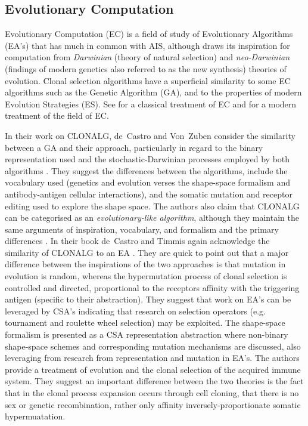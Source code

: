 %
%
\subsection{Evolutionary Computation}
\label{subsec:cs:related:ec}
Evolutionary Computation (EC) is a field of study of Evolutionary Algorithms (EA's) that has much in common with AIS, although draws its inspiration for computation from \emph{Darwinian} (theory of natural selection) and \emph{neo-Darwinian} (findings of modern genetics also referred to as the new synthesis) theories of evolution. Clonal selection algorithms have a superficial similarity to some EC algorithms such as the Genetic Algorithm (GA), and to the properties of modern Evolution Strategies (ES). See \cite{Fogel1995, Goldberg1989a} for a classical treatment of EC and \cite{Back2000, Back2000a} for a modern treatment of the field of EC. 

In their work on CLONALG, de~Castro and Von~Zuben consider the similarity between a GA and their approach, particularly in regard to the binary representation used and the stochastic-Darwinian processes employed by both algorithms \cite{Castro1999}. They suggest the differences between the algorithms, include the vocabulary used (genetics and evolution verses the shape-space formalism and antibody-antigen cellular interactions), and the somatic mutation and receptor editing used to explore the shape space. The authors also claim that CLONALG can be categorised as an \emph{evolutionary-like algorithm}, although they maintain the same arguments of inspiration, vocabulary, and formalism and the primary differences \cite{Castro2002}. In their book de~Castro and Timmis again acknowledge the similarity of CLONALG to an EA \cite{Castro2002a}. They are quick to point out that a major difference between the inspirations of the two approaches is that mutation in evolution is random, whereas the hypermutation process of clonal selection is controlled and directed, proportional to the receptors affinity with the triggering antigen (specific to their abstraction). They suggest that work on EA's can be leveraged by CSA's indicating that research on selection operators (e.g. tournament and roulette wheel selection) may be exploited. The shape-space formalism is presented as a CSA representation abstraction where non-binary shape-space schemes and corresponding mutation mechanisms are discussed, also leveraging from research from representation and mutation in EA's. The authors provide a treatment of evolution and the clonal selection of the acquired immune system. They suggest an important difference between the two theories is the fact that in the clonal process expansion occurs through cell cloning, that there is no sex or genetic recombination, rather only affinity inversely-proportionate somatic hypermuatation.

